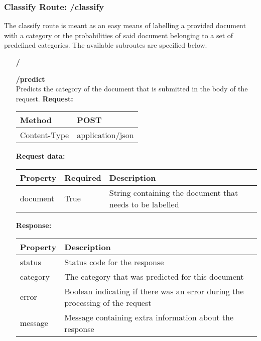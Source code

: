 \subsubsection{Classify Route: /classify}
The classify route is meant as an easy means of labelling a provided document with a category or the probabilities of said document belonging to a set of predefined categories.
The available subroutes are specified below.
\begin{enumerate}
\item[\textbf{/}]
\item[\textbf{/predict}] \\


Predicts the category of the document that is submitted in the body of the request.
\newline
\newline
\textbf{Request:}
\newline
\newline
\begin{tabular}{ | l | l |}
\hline
Method & POST\\ \hline
Content-Type & application/json\\ \hline
\end{tabular}
\newline
\newline
\textbf{Request data:}
\newline
\newline
\begin{tabular}{ | l | l | l |}
\hline
\textbf{Property} & \textbf{Required} & \textbf{Description}\\ \hline
document & True & String containing the document that needs to be labelled\\ \hline
\end{tabular}
\newline
\newline
\textbf{Response:}
\newline
\newline
\begin{tabular}{ | l | l |}
\hline
\textbf{Property} & \textbf{Description}\\ \hline
status & Status code for the response\\ \hline
category & The category that was predicted for this document\\ \hline
error & Boolean indicating if there was an error during the processing of the request\\ \hline
message & Message containing extra information about the response\\ \hline

\end{tabular}
\end{enumerate}
